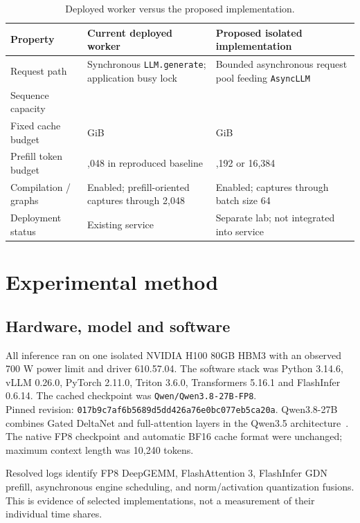 \documentclass[10pt,a4paper]{article}
\newcommand{\code}[1]{\texttt{\small #1}}
\begin{document}
\begin{table}[h]
\centering\small
\caption{Deployed worker versus the proposed implementation.}
\begin{tabularx}{\linewidth}{@{}l>{\raggedright\arraybackslash}X>{\raggedright\arraybackslash}X@{}}
\toprule
Property & Current deployed worker & Proposed isolated implementation \\
\midrule
Request path & Synchronous \code{LLM.generate}; application busy lock & Bounded asynchronous request pool feeding \code{AsyncLLM} \\
Sequence capacity & 1 & 64 \\
Fixed cache budget & 2 GiB & 16 GiB \\
Prefill token budget & 2,048 in reproduced baseline & 8,192 or 16,384 \\
Compilation / graphs & Enabled; prefill-oriented captures through 2,048 & Enabled; captures through batch size 64 \\
Deployment status & Existing service & Separate lab; not integrated into service \\
\bottomrule
\end{tabularx}
\end{table}

\newpage
\section{Experimental method}
\subsection{Hardware, model and software}
All inference ran on one isolated NVIDIA H100 80GB HBM3 with an observed
700 W power limit and driver 610.57.04. The software stack was Python 3.14.6,
vLLM 0.26.0, PyTorch 2.11.0, Triton 3.6.0, Transformers 5.16.1 and FlashInfer
0.6.14. The cached checkpoint was \code{Qwen/Qwen3.8-27B-FP8}.\\
Pinned revision: \code{017b9c7af6b5689d5dd426a76e0bc077eb5ca20a}.
Qwen3.8-27B combines Gated DeltaNet and full-attention layers in the Qwen3.5
architecture~\cite{qwen}. The native FP8 checkpoint and automatic BF16 cache
format were unchanged; maximum context length was 10,240 tokens.

Resolved logs identify FP8 DeepGEMM, FlashAttention 3, FlashInfer GDN prefill,
asynchronous engine scheduling, and norm/activation quantization fusions.
This is evidence of selected implementations, not a measurement of their
individual time shares.
\end{document}
